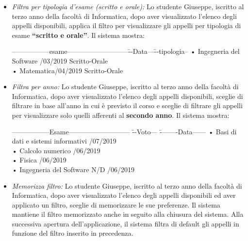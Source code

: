 \begin{itemize}
	\item \textit{Filtra per tipologia d’esame (scritto e orale):}
	Lo studente Giuseppe, iscritto al terzo anno della facoltà di Informatica, dopo aver visualizzato l’elenco degli appelli disponibili, applica il filtro per visualizzare gli appelli per tipologia di esame \textbf{“scritto e orale”}. Il sistema mostra:
	\begin{tabbing}
		\hspace{1cm}-----------------esame---------------------------\=--Data---\= --tipologia--\kill
		\hspace{1cm} • Ingegneria del Software  /03/2019\> \hspace{1cm}Scritto-Orale \\
		\hspace{1cm} • Matematica/04/2019 \> \hspace{1cm}Scritto-Orale \\
	\end{tabbing}

	\item \textit{Filtra per anno:}
	Lo studente Giuseppe, iscritto al terzo anno della facoltà di Informatica, dopo aver visualizzato l’elenco degli appelli disponibili, sceglie di filtrare in base all'anno in cui è previsto il corso e sceglie di filtrare gli appelli per visualizzare solo quelli afferenti al \textbf{secondo anno}. Il sistema mostra:
	\begin{tabbing}
		\hspace{1cm}-----------------Esame--------------------------- \= --Voto--- \= --------Data------ \kill
		\hspace{1cm} • Basi di dati e sistemi informativi  /07/2019 \\
		\hspace{1cm} • Calcolo numerico  /06/2019 \\
		\hspace{1cm} • Fisica  /06/2019 \\
		\hspace{1cm} • Ingegneria del Software \> N/D /06/2019  \\
	\end{tabbing}
	
	\item \textit{Memorizza filtro:}
	Lo studente Giuseppe, iscritto al terzo anno della facoltà di Informatica, dopo aver visualizzato l’elenco degli appelli disponibili ed aver applicato un filtro, sceglie di memorizzare le sue preferenze. Il sistema mantiene il filtro memorizzato anche in seguito alla chiusura del sistema. Alla successiva apertura dell’applicazione, il sistema filtra di default gli appelli in funzione del filtro inserito in precedenza.
	

\end{itemize}
